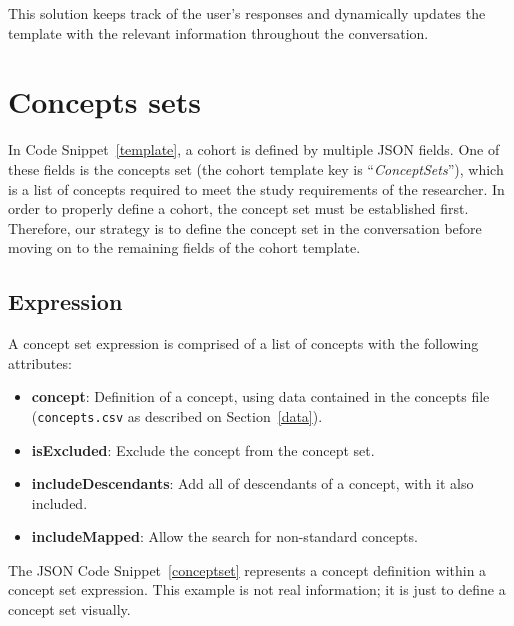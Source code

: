 This solution keeps track of the user's responses and dynamically updates the template with the relevant information throughout the conversation.


\section{Concepts sets}

In Code Snippet~\ref{template}, a cohort is defined by multiple JSON fields. One of these fields is the concepts set (the cohort template key is ``\textit{ConceptSets}''), which is a list of concepts required to meet the study requirements of the researcher. In order to properly define a cohort, the concept set must be established first. Therefore, our strategy is to define the concept set in the conversation before moving on to the remaining fields of the cohort template.


\subsection{Expression}
A concept set expression is comprised of a list of concepts with the following attributes:

\begin{itemize}
  \item \textbf{concept}: Definition of a concept, using data contained in the concepts file ({\small\normalfont\texttt{concepts.csv}} as described on Section~\ref{data}).
  \item \textbf{isExcluded}: Exclude the concept from the concept set.
  \item \textbf{includeDescendants}: Add all of descendants of a concept, with it also included.
  \item \textbf{includeMapped}: Allow the search for non-standard concepts.
\end{itemize}


The JSON Code Snippet~\ref{conceptset} represents a concept definition within a concept set expression. This example is not real information; it is just to define a concept set visually.

